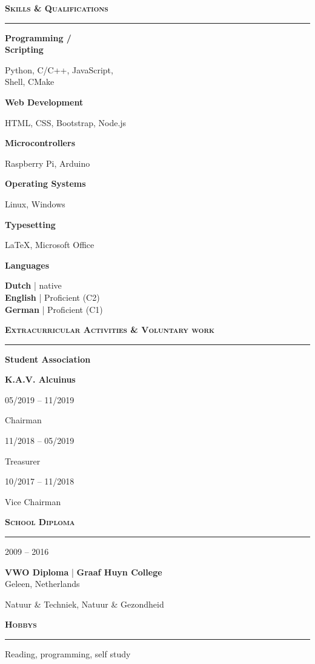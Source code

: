 \documentclass{article}
\newcommand{\themesep}{
  \begin{center}
    \vspace{-.7cm}
    \rule[-0.25cm]{\textwidth}{0.1pt}
  \end{center}
  \vspace{0.25cm}
}
\newcommand{\expsep}{\vspace{0.3cm}}
\newcommand{\lcol}{0.27\textwidth}
\newcommand{\rcol}{0.70\textwidth}
\newcommand{\lang}[2]{\normalsize{\bf #1} | {\normalsize #2}}
\newcommand{\theme}[2]{
  \noindent
  {\Large\textsc{\textbf{#1}}}
  \themesep
  {\normalsize #2}
  \expsep
  \expsep
}
\newcommand{\experience}[5]{
  \noindent
  \begin{minipage}[t]{\lcol}
    {\large #2}
    \hfill
  \end{minipage}
  \begin{minipage}[t]{\rcol}
    {\bf \Large #1} | {\bf \normalsize #3}\\
    {\normalsize #4}

    {\normalsize #5}
    \normalsize
  \end{minipage}
}
\newcommand{\rightblock}[2]{
  \noindent
  \begin{minipage}[t]{\lcol}
    {\large #1}
    \hfill
  \end{minipage}
  \begin{minipage}[t]{\rcol}
    {\large #2}
  \end{minipage}
}
\begin{document}
\theme{Skills \& Qualifications}{
  \rightblock{\textbf{Programming /\\Scripting}}{Python, C/C++, JavaScript,\\ Shell, CMake}
 
  \expsep
  \rightblock{\textbf{Web Development}}{HTML, CSS, Bootstrap, Node.js}
 
  \expsep
  \rightblock{\textbf{Microcontrollers}}{Raspberry Pi, Arduino}
 
  \expsep
  \rightblock{\textbf{Operating Systems}}{Linux, Windows}

  \expsep
  \rightblock{\textbf{Typesetting}}{\LaTeX, Microsoft Office}

  \expsep 
  \rightblock{\textbf{Languages}}{\lang{Dutch}{native} \\\lang{English}{Proficient (C2)} \\\lang{German}{Proficient (C1)}}
}

\theme{Extracurricular Activities \& Voluntary work}{
  \rightblock{\textbf{Student Association}}{\textbf{K.A.V. Alcuinus}}

  \expsep
  \rightblock{05/2019 -- 11/2019}{Chairman}

  \expsep
  \rightblock{11/2018 -- 05/2019}{Treasurer}

  \expsep
  \rightblock{10/2017 -- 11/2018}{Vice Chairman}
}

\theme{School Diploma}{
  \experience{VWO Diploma}{2009 -- 2016}{Graaf Huyn College}{Geleen, Netherlands}{\normalsize Natuur \& Techniek, Natuur \& Gezondheid}
}

\theme{Hobbys}
{
  \rightblock{}{Reading, programming, self study}
}

\vfill
\end{document}
